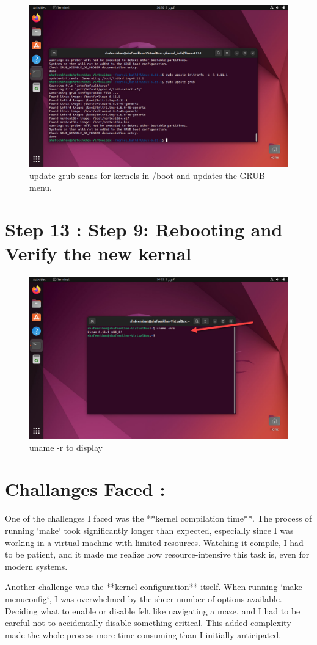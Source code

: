 \documentclass{article}
\begin{document}
\begin{figure}[H]
    \centering
    \includegraphics[width=0.8\linewidth]{01.jpg}
    \caption{update-grub scans for kernels in /boot and updates the GRUB menu.}
\end{figure}


\section{Step 13 : Step 9: Rebooting and Verify the new kernal}

\begin{figure}[H]
    \centering
    \includegraphics[width=0.8\linewidth]{00.jpg}
    \caption{uname -r to display}
\end{figure}

\section{Challanges Faced : }
One of the challenges I faced was the **kernel compilation time**. The process of running `make` took significantly longer than expected, especially since I was working in a virtual machine with limited resources. Watching it compile, I had to be patient, and it made me realize how resource-intensive this task is, even for modern systems.

Another challenge was the **kernel configuration** itself. When running `make menuconfig`, I was overwhelmed by the sheer number of options available. Deciding what to enable or disable felt like navigating a maze, and I had to be careful not to accidentally disable something critical. This added complexity made the whole process more time-consuming than I initially anticipated.
\end{document}

